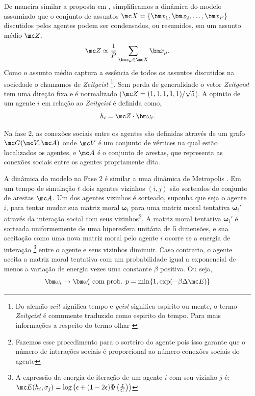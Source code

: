De maneira similar a proposta em \citep{Caticha2011a}, simplificamos a dinâmica
do modelo assumindo que o conjunto de assuntos $\mc X = \{ \bm x_1, \bm
x_2,\ldots,\bm x_P \}$ discutidos pelos agentes podem ser condensados,
ou resumidos, em um assunto médio $\mc Z$,
\[
\mc Z \propto \frac{1}{P}\sum_{\bm x_\mu \in \mc X}\bm x_\mu.
\]
Como o assunto médio captura a essência de todos os assuntos discutidos
na sociedade o chamamos de \textit{Zeitgeist} \footnote{Do alemão
\textit{zeit} significa tempo e \textit{geist} significa espirito ou mente,
o termo \textit{Zeitgeist} é comumente traduzido como espirito do tempo. Para
mais informações a respeito do termo olhar \citep{Forland2008}}. Sem
perda de generalidade o vetor \textit{Zeitgeist} tem uma direção fixa e
é normalizado ($\mc Z=(1,1,1,1,1)/\sqrt{5}$). A opinião de um agente
$i$ em relação ao \textit{Zeitgeist} é definida como, 
\[
h_i = \mc Z \cdot \bm \omega_i.
\]

Na fase 2, as conexões sociais entre os agentes são definidas através de um
grafo $\mc G(\mc V,\mc A)$ onde $\mc V$ é um conjunto de vértices na qual estão
localizados os agentes, e $\mc A$ é o conjunto de arestas, que representa as
conexões sociais entre os agentes propriamente dita. 

A dinâmica do modelo na Fase 2 é similar a uma dinâmica de Metropolis
\citep{Metropolis1953}. Em um tempo de simulação $t$ dois agentes vizinhos
$(i,j)$ são sorteados do conjunto de arestas $\mc A$.  Um dos agentes
vizinhos é sorteado, suponha que seja o agente $i$, para tentar mudar sua
matriz moral $\bm \omega_i$ para uma matriz moral tentativa $\bm \omega_i'$
através da interação social com seus vizinhos\footnote{Fazemos esse
procedimento para o sorteiro do agente pois isso garante que o número
de interações sociais é proporcional ao número conexões sociais do
agente}. A matriz moral tentativa $\bm \omega_i'$ é sorteada uniformemente
de uma hiperesfera unitária de 5 dimensões, e sua aceitação como uma nova
matriz moral pelo agente $i$ ocorre se a energia de interação \footnote{A
expressão da energia de iteração de um agente $i$ com seu vizinho
  $j$ é: \\ $\mc E (h_i,\sigma_j) = \log\left(\epsilon + (1 -
  2\epsilon)\Phi\left(\frac{z}{C}\right)\right)$}
entre o agente e seus vizinhos diminuir. Caso contrario, o agente aceita a
matriz moral tentativa com um probabilidade igual a exponencial de menos a
variação de energia vezes uma constante $\beta$ positiva. Ou seja,
\[
\bm \omega_i \rightarrow \bm \omega_i' \text{ com prob. } 
p = \min\{1,\exp( -\beta \Delta \mc E)\}
\]

